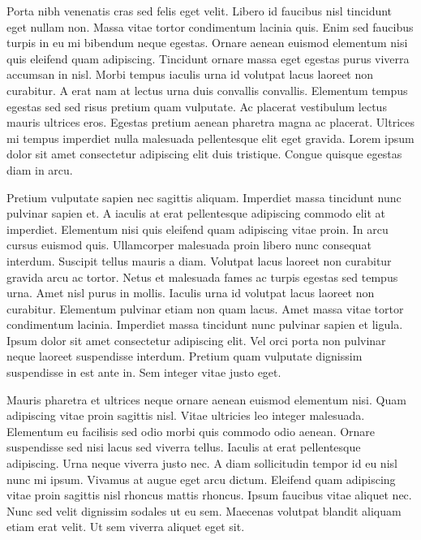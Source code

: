 \documentclass[11pt,a4paper]{article}
\begin{document}
Porta nibh venenatis cras sed felis eget velit. Libero id faucibus nisl tincidunt eget nullam non. Massa vitae tortor condimentum lacinia quis. Enim sed faucibus turpis in eu mi bibendum neque egestas. Ornare aenean euismod elementum nisi quis eleifend quam adipiscing. Tincidunt ornare massa eget egestas purus viverra accumsan in nisl. Morbi tempus iaculis urna id volutpat lacus laoreet non curabitur. A erat nam at lectus urna duis convallis convallis. Elementum tempus egestas sed sed risus pretium quam vulputate. Ac placerat vestibulum lectus mauris ultrices eros. Egestas pretium aenean pharetra magna ac placerat. Ultrices mi tempus imperdiet nulla malesuada pellentesque elit eget gravida. Lorem ipsum dolor sit amet consectetur adipiscing elit duis tristique. Congue quisque egestas diam in arcu.

Pretium vulputate sapien nec sagittis aliquam. Imperdiet massa tincidunt nunc pulvinar sapien et. A iaculis at erat pellentesque adipiscing commodo elit at imperdiet. Elementum nisi quis eleifend quam adipiscing vitae proin. In arcu cursus euismod quis. Ullamcorper malesuada proin libero nunc consequat interdum. Suscipit tellus mauris a diam. Volutpat lacus laoreet non curabitur gravida arcu ac tortor. Netus et malesuada fames ac turpis egestas sed tempus urna. Amet nisl purus in mollis. Iaculis urna id volutpat lacus laoreet non curabitur. Elementum pulvinar etiam non quam lacus. Amet massa vitae tortor condimentum lacinia. Imperdiet massa tincidunt nunc pulvinar sapien et ligula. Ipsum dolor sit amet consectetur adipiscing elit. Vel orci porta non pulvinar neque laoreet suspendisse interdum. Pretium quam vulputate dignissim suspendisse in est ante in. Sem integer vitae justo eget.

Mauris pharetra et ultrices neque ornare aenean euismod elementum nisi. Quam adipiscing vitae proin sagittis nisl. Vitae ultricies leo integer malesuada. Elementum eu facilisis sed odio morbi quis commodo odio aenean. Ornare suspendisse sed nisi lacus sed viverra tellus. Iaculis at erat pellentesque adipiscing. Urna neque viverra justo nec. A diam sollicitudin tempor id eu nisl nunc mi ipsum. Vivamus at augue eget arcu dictum. Eleifend quam adipiscing vitae proin sagittis nisl rhoncus mattis rhoncus. Ipsum faucibus vitae aliquet nec. Nunc sed velit dignissim sodales ut eu sem. Maecenas volutpat blandit aliquam etiam erat velit. Ut sem viverra aliquet eget sit.
\end{document}
